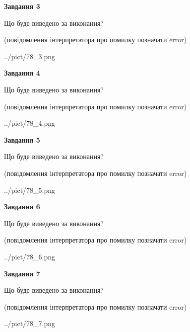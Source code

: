 \documentclass[12pt, ukrainian]{article}
\begin{document}
{\begin {large}
{\begin {center}\textbf{Завдання 3}\end {center}}\par
Що буде виведено за виконання?\par
 (повідомлення інтерпретатора про помилку позначати error)\par
\begin{center}
	{../pict/78_3.png}
\end{center}
\newpage

{\begin {center}\textbf{Завдання 4}\end {center}}\par
Що буде виведено за виконання?\par
 (повідомлення інтерпретатора про помилку позначати error)\par
\begin{center}
	{../pict/78_4.png}
\end{center}
\newpage

{\begin {center}\textbf{Завдання 5}\end {center}}\par
Що буде виведено за виконання?\par
 (повідомлення інтерпретатора про помилку позначати error)\par
\begin{center}
	{../pict/78_5.png}
\end{center}
\newpage

{\begin {center}\textbf{Завдання 6}\end {center}}\par
Що буде виведено за виконання?\par
 (повідомлення інтерпретатора про помилку позначати error)\par
\begin{center}
	{../pict/78_6.png}
\end{center}
\newpage

{\begin {center}\textbf{Завдання 7}\end {center}}\par
Що буде виведено за виконання?\par
 (повідомлення інтерпретатора про помилку позначати error)\par
\begin{center}
	{../pict/78_7.png}
\end{center}
\newpage


\end{large}}
\end{document}
